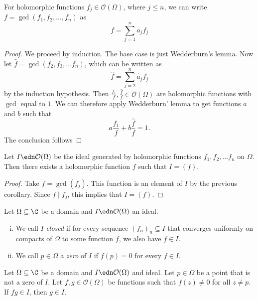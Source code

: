 \begin{posledica}
For holomorphic functions $f_j \in \mathcal{O}(\Omega)$, where
$j \leq n$, we can write $f = \gcd(f_1, f_2, \dots, f_n)$ as 
\[
f = \sum_{j=1}^n a_j f_j
\]
\end{posledica}

\begin{proof}
We proceed by induction. The base case is just Wedderburn's lemma.
Now let $\hat{f} = \gcd(f_2, f_3, \dots f_n)$, which can be
written as
\[
\hat{f} = \sum_{j=2}^n \hat{a}_j f_j
\]
by the induction hypothesis. Then
$\frac{f_1}{f}, \frac{\hat{f}}{f} \in \mathcal{O}(\Omega)$ are
holomorphic functions with $\gcd$ equal to $1$. We can therefore
apply Wedderburn' lemma to get functions $a$ and $b$ such that
\[
a \frac{f_1}{f} + b \frac{\hat{f}}{f} = 1.
\]
The conclusion follows
\end{proof}

\begin{izrek}
Let $I \edn \mathcal{O}(\Omega)$ be the ideal generated by
holomorphic functions $f_1, f_2, \dots f_n$ on $\Omega$. Then there
exists a holomorphic function $f$ such that $I = (f)$.
\end{izrek}

\begin{proof}
Take $f = \gcd(f_j)$. This function is an element of $I$ by the
previous corollary. Since $f \mid f_j$, this implies that
$I = (f)$.
\end{proof}

\begin{definicija}
Let $\Omega \subseteq \C$ be a domain and
$I \edn \mathcal{O}(\Omega)$ an ideal.

\begin{enumerate}[i)]
\item We call $I$ \emph{closed} if for every
sequence $(f_n)_n \subseteq I$ that converges uniformly on compacts
of $\Omega$ to some function $f$, we also have $f \in I$.
\item We call $p \in \Omega$ a \emph{zero} of $I$ if
$f(p) = 0$ for every $f \in I$.
\end{enumerate}
\end{definicija}

\begin{lema}
Let $\Omega \subseteq \C$ be a domain and
$I \edn \mathcal{O}(\Omega)$ and ideal. Let $p \in \Omega$ be a
point that is not a zero of $I$. Let
$f, g \in \mathcal{O}(\Omega)$ be functions such that $f(z) \ne 0$
for all $z \ne p$. If $f g \in I$, then $g \in I$.
\end{lema}

